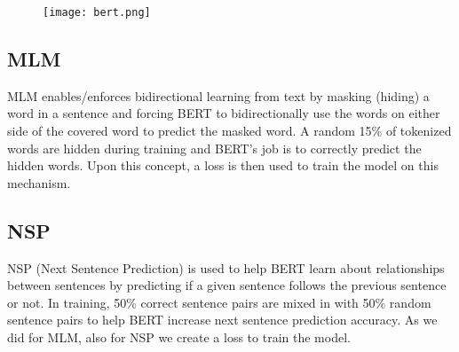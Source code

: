 \documentclass[12pt]{article}
\begin{document}
\begin{figure}
    \centering
    \texttt{[image: bert.png]}
    \label{fig:bert}
\end{figure}

\subsection{MLM}
MLM enables/enforces bidirectional learning from text by masking (hiding) 
a word in a sentence and forcing BERT to bidirectionally use the words on 
either side of the covered word to predict the masked word.
A random 15\% of tokenized words are hidden during training and BERT's job 
is to correctly predict the hidden words. Upon this concept, a loss is 
then used to train the model on this mechanism.

\subsection{NSP}
NSP (Next Sentence Prediction) is used to help BERT learn about relationships 
between sentences by predicting if a given sentence follows the previous 
sentence or not. In training, 50\% correct sentence pairs are mixed in 
with 50\% random sentence pairs to help BERT increase next sentence 
prediction accuracy. As we did for MLM, also for NSP we create a loss to train the model.
\end{document}

